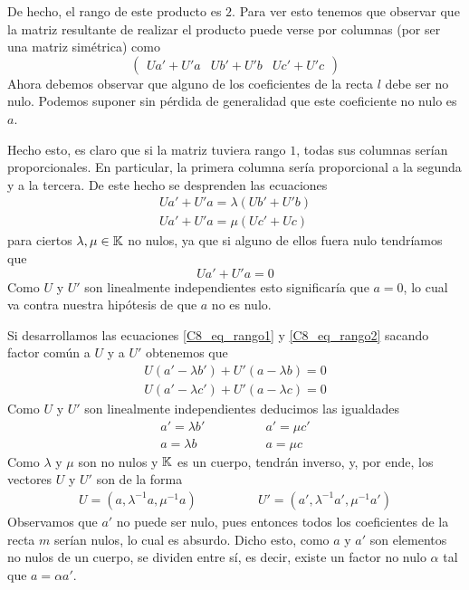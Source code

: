 De hecho, el rango de este producto es $2$. Para ver esto tenemos que observar que la matriz resultante de realizar el producto puede verse por columnas (por ser una matriz simétrica) como
\[\left(\begin{array}{c|c|c}
Ua'+U'a&Ub'+U'b&Uc'+U'c
\end{array}\right)\]
Ahora debemos observar que alguno de los coeficientes de la recta $l$ debe ser no nulo. Podemos suponer sin pérdida de generalidad que este coeficiente no nulo es $a$.

Hecho esto, es claro que si la matriz tuviera rango $1$, todas sus columnas serían proporcionales. En particular, la primera columna sería proporcional a la segunda y a la tercera. De este hecho se desprenden las ecuaciones
\begin{gather}
	\label{C8_eq_rango1}
	Ua'+U'a=\lambda(Ub'+U'b)\\
	\label{C8_eq_rango2}
	Ua'+U'a=\mu(Uc'+Uc)
\end{gather}
para ciertos $\lambda,\mu\in\mathbb{K}$ no nulos, ya que si alguno de ellos fuera nulo tendríamos que
\[Ua'+U'a=0\]
Como $U$ y $U'$ son linealmente independientes esto significaría que $a=0$, lo cual va contra nuestra hipótesis de que $a$ no es nulo.

Si desarrollamos las ecuaciones \eqref{C8_eq_rango1} y \eqref{C8_eq_rango2} sacando factor común a $U$ y a $U'$ obtenemos que
\begin{gather}
	U(a'-\lambda b')+U'(a-\lambda b)=0\\
	U(a'-\lambda c')+U'(a-\lambda c)=0
\end{gather}
Como $U$ y $U'$ son linealmente independientes deducimos las igualdades
\begin{equation}
	\begin{array}{cc}
	a' = \lambda b' \qquad&\qquad a' = \mu c'\\
	a = \lambda b \qquad&\qquad a = \mu c 
	\end{array}
\end{equation}
Como $\lambda$ y $\mu$ son no nulos y $\mathbb{K}$ es un cuerpo, tendrán inverso, y, por ende, los vectores $U$ y $U'$ son de la forma
\begin{equation}
	\begin{array}{cc}
	U=(a,\lambda^{-1}a,\mu^{-1}a)\qquad&\qquad U'=(a',\lambda^{-1}a', \mu^{-1}a')
	\end{array}
\end{equation}
Observamos que $a'$ no puede ser nulo, pues entonces todos los coeficientes de la recta $m$ serían nulos, lo cual es absurdo. Dicho esto, como $a$ y $a'$ son elementos no nulos de un cuerpo, se dividen entre sí, es decir, existe un factor no nulo $\alpha$ tal que $a=\alpha a'$.

